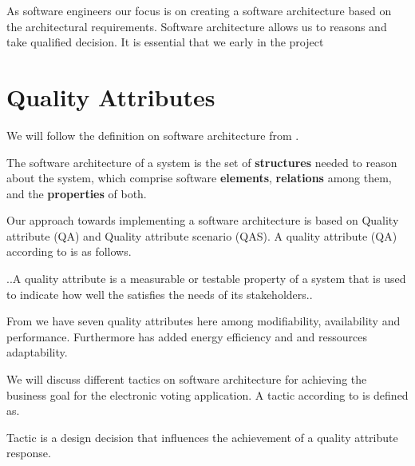 As software engineers our focus is on creating a software architecture based on the architectural requirements. Software architecture allows us to reasons and take qualified decision. It is essential that we early in the project    \cite{un}

\section{Quality Attributes}
We will follow the definition on software architecture from \cite{Bass}. 
\begin{defi}
The software architecture of a system is the set of \textbf{structures} needed to reason about the system, which comprise software \textbf{elements}, \textbf{relations} among them, and the \textbf{properties} of both. 
\end{defi}


Our approach towards implementing a software architecture is based on Quality attribute (QA) and Quality attribute scenario (QAS). A quality attribute (QA) according to \cite{Bass} is as follows.

\begin{defi}
..A quality attribute is a measurable or testable property of a system that is used to indicate how well the satisfies the needs of its stakeholders..  
\end{defi}



From \cite{Bass} we have seven quality attributes here among modifiability, availability and performance. Furthermore \cite{Kjaergaard:2015:AQT:2737182.2737196} has added energy efficiency and and ressources adaptability.  


We will discuss different tactics on software architecture for achieving the business goal for the electronic voting application. A tactic according to \cite{Bass} is defined as.

\begin{defi}
Tactic is a design decision that influences the achievement of a quality attribute response. 
\end{defi}

